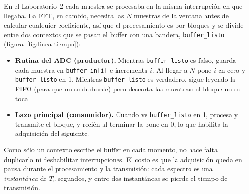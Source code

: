 \documentclass[11pt,a4paper]{article}
\begin{document}
En el Laboratorio~2 cada muestra se procesaba en la misma interrupción en
que llegaba. La FFT, en cambio, necesita las $N$ muestras de la ventana
antes de calcular cualquier coeficiente, así que el procesamiento es por
bloques y se divide entre dos contextos que se pasan el buffer con una
bandera, \texttt{buffer\_listo} (figura~\ref{fig:linea-tiempo}):

\begin{itemize}
  \item \textbf{Rutina del ADC (productor).} Mientras
        \texttt{buffer\_listo} es falso, guarda cada muestra en
        \texttt{buffer\_in[i]} e incrementa $i$. Al llegar a $N$ pone $i$
        en cero y \texttt{buffer\_listo} en 1. Mientras
        \texttt{buffer\_listo} es verdadero, sigue leyendo la FIFO (para que
        no se desborde) pero descarta las muestras: el bloque no se toca.
  \item \textbf{Lazo principal (consumidor).} Cuando ve
        \texttt{buffer\_listo} en 1, procesa y transmite el bloque, y recién
        al terminar la pone en 0, lo que habilita la adquisición del
        siguiente.
\end{itemize}

Como sólo un contexto escribe el buffer en cada momento, no hace falta
duplicarlo ni deshabilitar interrupciones. El costo es que la adquisición
queda en pausa durante el procesamiento y la transmisión: cada espectro es
una \emph{instantánea} de $T_v$ segundos, y entre dos instantáneas se pierde
el tiempo de transmisión.
\end{document}
